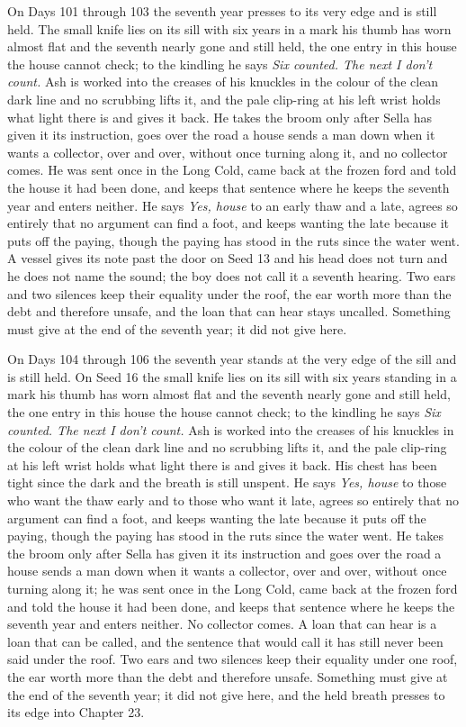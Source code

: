 \documentclass{design/chronicle}
\begin{document}
{On Days 101 through 103 the seventh year presses to its very edge and is still held. The small knife lies on its sill with six years in a mark his thumb has worn almost flat and the seventh nearly gone and still held, the one entry in this house the house cannot check; to the kindling he says \emph{Six counted. The next I don’t count.} Ash is worked into the creases of his knuckles in the colour of the clean dark line and no scrubbing lifts it, and the pale clip-ring at his left wrist holds what light there is and gives it back. He takes the broom only after Sella has given it its instruction, goes over the road a house sends a man down when it wants a collector, over and over, without once turning along it, and no collector comes. He was sent once in the Long Cold, came back at the frozen ford and told the house it had been done, and keeps that sentence where he keeps the seventh year and enters neither. He says \emph{Yes, house} to an early thaw and a late, agrees so entirely that no argument can find a foot, and keeps wanting the late because it puts off the paying, though the paying has stood in the ruts since the water went. A vessel gives its note past the door on Seed 13 and his head does not turn and he does not name the sound; the boy does not call it a seventh hearing. Two ears and two silences keep their equality under the roof, the ear worth more than the debt and therefore unsafe, and the loan that can hear stays uncalled. Something must give at the end of the seventh year; it did not give here.

On Days 104 through 106 the seventh year stands at the very edge of the sill and is still held. On Seed 16 the small knife lies on its sill with six years standing in a mark his thumb has worn almost flat and the seventh nearly gone and still held, the one entry in this house the house cannot check; to the kindling he says \emph{Six counted. The next I don’t count.} Ash is worked into the creases of his knuckles in the colour of the clean dark line and no scrubbing lifts it, and the pale clip-ring at his left wrist holds what light there is and gives it back. His chest has been tight since the dark and the breath is still unspent. He says \emph{Yes, house} to those who want the thaw early and to those who want it late, agrees so entirely that no argument can find a foot, and keeps wanting the late because it puts off the paying, though the paying has stood in the ruts since the water went. He takes the broom only after Sella has given it its instruction and goes over the road a house sends a man down when it wants a collector, over and over, without once turning along it; he was sent once in the Long Cold, came back at the frozen ford and told the house it had been done, and keeps that sentence where he keeps the seventh year and enters neither. No collector comes. A loan that can hear is a loan that can be called, and the sentence that would call it has still never been said under the roof. Two ears and two silences keep their equality under one roof, the ear worth more than the debt and therefore unsafe. Something must give at the end of the seventh year; it did not give here, and the held breath presses to its edge into Chapter 23.

}
\end{document}
